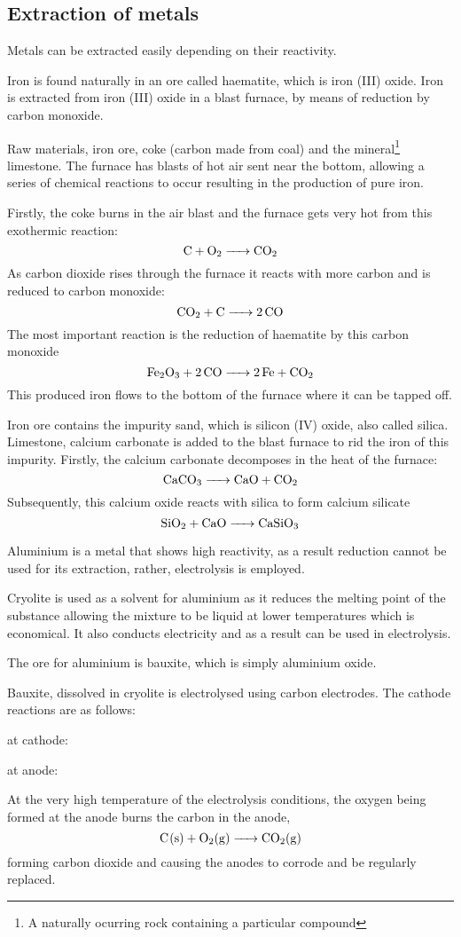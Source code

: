 \subsection{Extraction of metals}
Metals can be extracted easily depending on their reactivity.

Iron is found naturally in an ore called haematite, which is iron (III) oxide. Iron is extracted
from iron (III) oxide in a blast furnace, by means of reduction by carbon monoxide.

Raw materials, iron ore, coke (carbon made from coal) and the mineral\footnote{A naturally ocurring
rock containing a particular compound} limestone. The furnace has blasts of hot air sent near
the bottom, allowing a series of chemical reactions to occur resulting in the production of pure
iron.

Firstly, the coke burns in the air blast and the furnace gets very hot from this exothermic
reaction:
$$ \ce{C + O2 -> CO2} $$
As carbon dioxide rises through the furnace it reacts with more carbon and is reduced to carbon
monoxide:
$$ \ce{CO2 + C -> 2CO} $$
The most important reaction is the reduction of haematite by this carbon monoxide
$$ \ce{Fe2O3 + 2CO -> 2Fe + CO2} $$
This produced iron flows to the bottom of the furnace where it can be tapped off.

Iron ore contains the impurity sand, which is silicon (IV) oxide, also called silica. Limestone,
calcium carbonate
is added to the blast furnace to rid the iron of this impurity. Firstly, the calcium carbonate
decomposes in the heat of the furnace:
$$ \ce{CaCO3 -> CaO + CO2} $$
Subsequently, this calcium oxide reacts with silica to form calcium silicate
$$ \ce{SiO2 + CaO -> CaSiO3} $$

Aluminium is a metal that shows high reactivity, as a result reduction cannot be used for its 
extraction, rather, electrolysis is employed.

Cryolite is used as a solvent for aluminium as it reduces the melting point of the substance 
allowing the mixture to be liquid at lower temperatures which is economical. It also conducts
electricity and as a result can be used in electrolysis.

The ore for aluminium is bauxite, which is simply aluminium oxide.

Bauxite, dissolved in cryolite is electrolysed using carbon electrodes. The cathode reactions
are as follows:
\begin{center}
	at cathode: 

	at anode: 
\end{center}

At the very high temperature of the electrolysis conditions, the oxygen being formed at the anode
burns the carbon in the anode,
$$\ce{C(s) + O2(g) -> CO2(g)}$$
forming carbon dioxide and causing the anodes to corrode and be regularly replaced.
